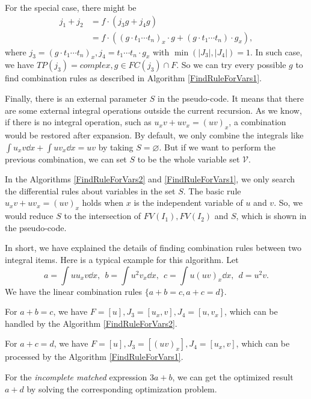 For the special case, there might be 
\begin{equation}
\begin{split}
j_1 + j_2   &= f \cdot ( j_3 g + j_4 g ) \\ 
            &= f \cdot ( (g \cdot t_1\cdots t_n)_x\cdot g + (g \cdot t_1\cdots t_n)\cdot g_x ),
\end{split}
\end{equation}
where $j_3=(g \cdot t_1\cdots t_n)_x , j_4=t_1\cdots t_n\cdot g_x$ with $\min(|J_3|,|J_4|)=1$. In such case, we have $TP(j_3)=complex, g\in FC(j_3)\cap F$. So we can try every possible $g$ to find combination rules as described in Algorithm \ref{FindRuleForVars1}. 

Finally, there is an external parameter $S$ in the pseudo-code. It means that there are some external integral operations outside the current recursion. As we know, if there is no integral operation, such as $u_x v + u v_x = (uv)_x$, a combination would be restored after expansion. By default, we only combine the integrals like $\int\!{u_x v\dd x} + \int\!{u v_x\dd x} = uv$ by taking $S=\varnothing$. But if we want to perform the previous combination, we can set $S$ to be the whole variable set $\mathcal V$. 

In the Algorithms \ref{FindRuleForVars2} and \ref{FindRuleForVars1}, we only search the differential rules about variables in the set $S$.  The basic rule $u_x v + u v_x = (uv)_x$ holds when $x$ is the independent variable of $u$ and $v$. So, we would reduce $S$ to the intersection of $FV(I_1),FV(I_2)$ and $S$, which is shown in the pseudo-code.

In short, we have explained the details of finding combination rules between two integral items. Here is a typical example for this algorithm. Let 
\begin{equation}
a=\int\!{uu_xv \dd x},~~b=\int\!{u^2v_x\dd x},~~c=\int\!{u(uv)_x\dd x},~~d=u^2v.
\end{equation}
We have the linear combination rules $\{a+b=c,a+c=d\}$. 

For $a+b=c$, we have $F=[u],J_3=[u_x,v],J_4=[u,v_x]$, which can be handled by the Algorithm \ref{FindRuleForVars2}.

For $a+c=d$, we have $F=[u],J_3=[(uv)_x],J_4=[u_x,v]$, which can be processed by the Algorithm \ref{FindRuleForVars1}.  

For the \emph{incomplete matched} expression $3a+b$,
we can get the optimized result $a+d$ by solving the corresponding optimization problem.

